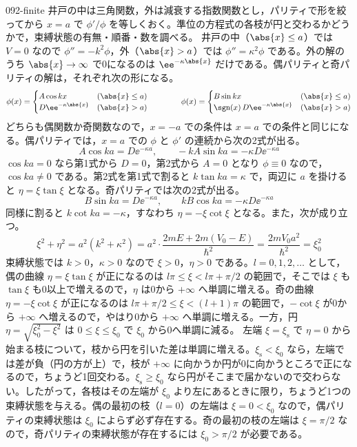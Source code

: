 \documentclass[uplatex,dvipdfmx,a4paper,11pt]{jsarticle}
\begin{document}
\kaitouhen
{}
\begin{kaisetsu}{092-finite}
\houshin 井戸の中は三角関数，外は減衰する指数関数とし，パリティで形を絞ってから $x=a$ で $\phi'/\phi$ を等しくおく。準位の方程式の各枝が円と交わるかどうかで，束縛状態の有無・順番・数を調べる。
\keisan
{} 井戸の中（$\abs{x}\le a$）では $V=0$ なので $\phi''=-k^{2}\phi$，外（$\abs{x}>a$）では $\phi''=\kappa^{2}\phi$ である。外の解のうち $\abs{x}\to\infty$ で0になるのは $\ee^{-\kappa\abs{x}}$ だけである。偶パリティと奇パリティの解は，それぞれ次の形になる。
\[ \phi(x)=\begin{cases} A\cos kx & (\abs{x}\le a)\\ D\ee^{-\kappa\abs{x}} & (\abs{x}>a)\end{cases}\qquad\qquad \phi(x)=\begin{cases} B\sin kx & (\abs{x}\le a)\\ \sgn(x)\,D\ee^{-\kappa\abs{x}} & (\abs{x}>a)\end{cases} \]
どちらも偶関数か奇関数なので，$x=-a$ での条件は $x=a$ での条件と同じになる。偶パリティでは，$x=a$ での $\phi$ と $\phi'$ の連続から次の2式が出る。
\[ A\cos ka=D\ee^{-\kappa a},\qquad -kA\sin ka=-\kappa D\ee^{-\kappa a} \]
$\cos ka=0$ なら第1式から $D=0$，第2式から $A=0$ となり $\phi\equiv 0$ なので，$\cos ka\ne 0$ である。第2式を第1式で割ると $k\tan ka=\kappa$ で，両辺に $a$ を掛けると $\eta=\xi\tan\xi$ となる。奇パリティでは次の2式が出る。
\[ B\sin ka=D\ee^{-\kappa a},\qquad kB\cos ka=-\kappa D\ee^{-\kappa a} \]
同様に割ると $k\cot ka=-\kappa$，すなわち $\eta=-\xi\cot\xi$ となる。また，次が成り立つ。
\[ \xi^{2}+\eta^{2}=a^{2}\left(k^{2}+\kappa^{2}\right)=a^{2}\cdot\frac{2mE+2m(V_{0}-E)}{\hbar^{2}}=\frac{2mV_{0}a^{2}}{\hbar^{2}}=\xi_{0}^{2} \]
 束縛状態では $k>0$，$\kappa>0$ なので $\xi>0$，$\eta>0$ である。$l=0,1,2,\dots$ として，偶の曲線 $\eta=\xi\tan\xi$ が正になるのは $l\pi\le\xi<l\pi+\pi/2$ の範囲で，そこでは $\xi$ も $\tan\xi$ も0以上で増えるので，$\eta$ は0から $+\infty$ へ単調に増える。奇の曲線 $\eta=-\xi\cot\xi$ が正になるのは $l\pi+\pi/2\le\xi<(l+1)\pi$ の範囲で，$-\cot\xi$ が0から $+\infty$ へ増えるので，やはり0から $+\infty$ へ単調に増える。一方，円 $\eta=\sqrt{\xi_{0}^{2}-\xi^{2}}$ は $0\le\xi\le\xi_{0}$ で $\xi_{0}$ から0へ単調に減る。
左端 $\xi=\xi_{\mathrm{s}}$ で $\eta=0$ から始まる枝について，枝から円を引いた差は単調に増える。$\xi_{\mathrm{s}}<\xi_{0}$ なら，左端では差が負（円の方が上）で，枝が $+\infty$ に向かうか円が0に向かうところで正になるので，ちょうど1回交わる。$\xi_{\mathrm{s}}\ge\xi_{0}$ なら円がそこまで届かないので交わらない。したがって，各枝はその左端が $\xi_{0}$ より左にあるときに限り，ちょうど1つの束縛状態を与える。偶の最初の枝（$l=0$）の左端は $\xi=0<\xi_{0}$ なので，偶パリティの束縛状態は $\xi_{0}$ によらず必ず存在する。奇の最初の枝の左端は $\xi=\pi/2$ なので，奇パリティの束縛状態が存在するには $\xi_{0}>\pi/2$ が必要である。

\end{kaisetsu}
\end{document}
